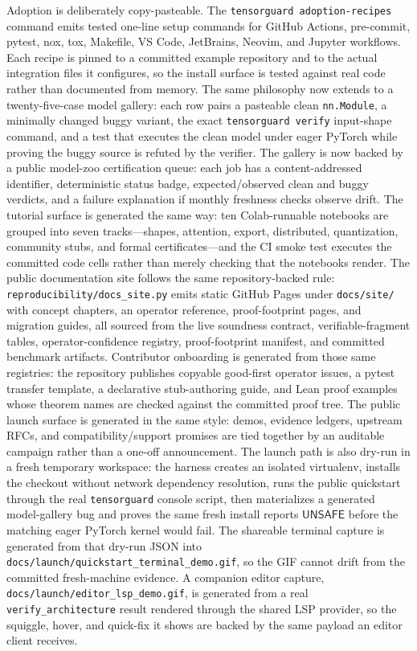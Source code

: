 \documentclass[11pt]{article}
\newcommand{\unsafe}{\ensuremath{\mathsf{UNSAFE}}}
\begin{document}
Adoption is deliberately copy-pasteable.  The \texttt{tensorguard
adoption-recipes} command emits tested one-line setup commands for GitHub
Actions, pre-commit, pytest, nox, tox, Makefile, VS Code, JetBrains, Neovim, and
Jupyter workflows.  Each recipe is pinned to a committed example repository and
to the actual integration files it configures, so the install surface is tested
against real code rather than documented from memory.  The same philosophy now
extends to a twenty-five-case model gallery: each row pairs a pasteable clean
\texttt{nn.Module}, a minimally changed buggy variant, the exact
\texttt{tensorguard verify} input-shape command, and a test that executes the
clean model under eager PyTorch while proving the buggy source is refuted by the
verifier.  The gallery is now backed by a public model-zoo certification queue:
each job has a content-addressed identifier, deterministic status badge,
expected/observed clean and buggy verdicts, and a failure explanation if monthly
freshness checks observe drift.  The tutorial surface is generated the same way:
ten Colab-runnable notebooks are grouped into seven tracks---shapes, attention, export,
distributed, quantization, community stubs, and formal certificates---and the
CI smoke test executes the committed code cells rather than merely checking that
the notebooks render.  The public documentation site follows the same
repository-backed rule: \texttt{reproducibility/docs\_site.py} emits static
GitHub Pages under \texttt{docs/site/} with concept chapters, an operator
reference, proof-footprint pages, and migration guides, all sourced from the live
soundness contract, verifiable-fragment tables, operator-confidence registry,
proof-footprint manifest, and committed benchmark artifacts.
Contributor onboarding is generated from those same registries: the repository
publishes copyable good-first operator issues, a pytest transfer template, a
declarative stub-authoring guide, and Lean proof examples whose theorem names are
checked against the committed proof tree.
The public launch surface is generated in the same style: demos, evidence
ledgers, upstream RFCs, and compatibility/support promises are tied together by
an auditable campaign rather than a one-off announcement.  The launch path is
also dry-run in a fresh temporary workspace: the harness creates an isolated
virtualenv, installs the checkout without network dependency resolution, runs
the public quickstart through the real \texttt{tensorguard} console script, then
materializes a generated model-gallery bug and proves the same fresh install
reports \unsafe{} before the matching eager PyTorch kernel would fail.  The
shareable terminal capture is generated from that dry-run JSON into
\texttt{docs/launch/quickstart\_terminal\_demo.gif}, so the GIF cannot drift from
the committed fresh-machine evidence.  A companion editor capture,
\texttt{docs/launch/editor\_lsp\_demo.gif}, is generated from a real
\texttt{verify\_architecture} result rendered through the shared LSP provider,
so the squiggle, hover, and quick-fix it shows are backed by the same payload an
editor client receives.
\end{document}
